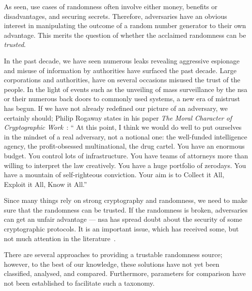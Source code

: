 As seen, use cases of randomness often involve either money, benefits or disadvantages, and securing secrets. Therefore, adversaries have an obvious interest in manipulating the outcome of a random number generator to their own advantage.
This merits the question of whether the acclaimed randomness can be \emph{trusted}.

In the past decade, we have seen numerous leaks revealing aggressive espionage and misuse of information by authorities have surfaced the past decade.
Large corporations and authorities, have on several occasions misused the trust of the people.
In the light of events such as the unveiling of mass surveillance by the \gls{nsa} or their numerous back doors to commonly used systems, a new era of mistrust has begun.
If we have not already redefined our picture of an adversary, we certainly should;
Philip Rogaway states in his paper \textit{The Moral Character of Cryptographic Work}~\cite{rogaway2015moral}:
\enquote{%
    At this point, I think we would do well to put ourselves in the mindset of a real adversary, not a notional one:
    the well-funded intelligence agency, the profit-obsessed multinational, the drug cartel.
    You have an enormous budget. You control lots of infrastructure.
    You have teams of attorneys more than willing to interpret the law creatively.
    You have a huge portfolio of zerodays. You have a mountain of self-righteous conviction.
    Your aim is to Collect it All, Exploit it All, Know it All.}%


Since many things rely on strong cryptography and randomness, we need to make sure that the randomness can be trusted. If the randomness is broken, adversaries can get an unfair advantage --- \gls{nsa} has spread doubt about the security of some cryptographic protocols. It is an important issue, which has received some, but not much attention in the literature~\cite{lenstra2015random}.

There are several approaches to providing a trustable randomness source; however, to the best of our knowledge, these solutions have not yet been classified, analysed, and compared.
Furthermore, parameters for comparison have not been established to facilitate such a taxonomy.

